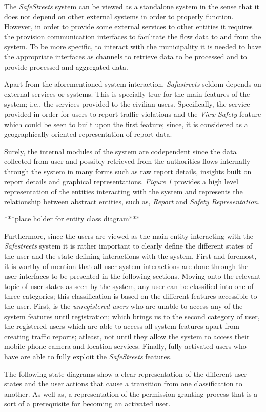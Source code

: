 The \emph{SafeStreets} system can be viewed as a standalone system in the sense that it does not depend on other external systems in order to properly function. However, in order to provide some external services to other entities it requires the provision communication interfaces to facilitate the flow data to and from the system. To be more specific, to interact with the municipality it is needed to have the appropriate interfaces as channels to retrieve data to be processed and to provide processed and aggregated data.

Apart from the aforementioned system interaction, \emph{Safastreets} seldom depends on external services or systems. This is specially true for the main features of the system; i.e., the services provided to the civilian users. Specifically, the service provided in order for users to report traffic violations and the \emph{View Safety} feature which could be seen to built upon the first feature; since, it is considered as a geographically oriented representation of report data.

Surely, the internal modules of the system are codependent since the data collected from user and possibly retrieved from the authorities flows internally through the system in many forms such as raw report details, insights built on report details and graphical representations. \emph{Figure 1} provides a high level representation of the entities interacting with the system and represents the relationship between abstract entities, such as, \emph{Report} and \emph{Safety Representation}.
\newpage

***place holder for entity class diagram***

\newpage
Furthermore, since the users are viewed as the main entity interacting with the \emph{Safestreets} system it is rather important to clearly define the different states of the user and the state defining interactions with the system. First and foremost, it is worthy of mention that all user-system interactions are done through the user interfaces to be presented in the following sections. Moving onto the relevant topic of user states as seen by the system, any user can be classified into one of three categories; this classification is based on the different features accessible to the user. First, is the \emph{unregistered users} who are unable to access any of the system features until registration; which brings us to the second category of user, the registered users which are able to access all system features apart from creating traffic reports; atleast, not until they allow the system to access their mobile phone camera and location services. Finally, fully activated users who have are able to fully exploit the \emph{SafeStreets} features.

The following state diagrams show a clear representation of the different user states and the user actions that cause a transition from one classification to another. As well as, a representation of the permission granting process that is a sort of a prerequisite for becoming an activated user.
